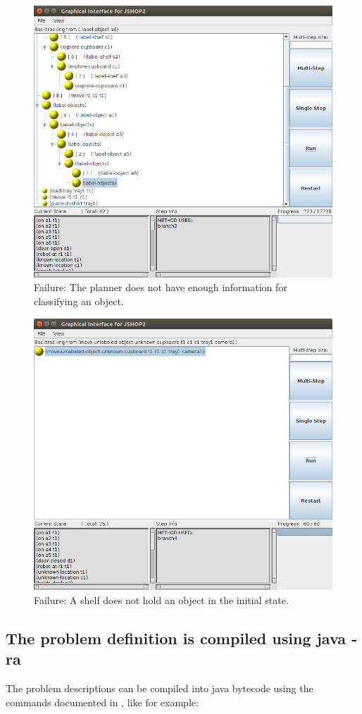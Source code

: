 \documentclass[paper=a4, fontsize=11pt]{scrartcl}
\begin{document}
\begin{figure} [ht!]
	\centering
	\includegraphics[width=0.65\linewidth]{images/failure-1}
	\caption{Failure: The planner does not have enough information for classifying an object.}
	\label{fig:failure-1}
\end{figure}


\begin{figure} [h!]
	\centering
	\includegraphics[width=0.65\linewidth]{images/failure-2}
	\caption{Failure: A shelf does not hold an object in the initial state.}
	\label{fig:failure-2}
\end{figure}


\subsection{The problem definition is compiled using java -ra}

The problem descriptions can be compiled into java bytecode using the commands documented in \cite{Ilghami2006}, like for example: 
\end{document}
